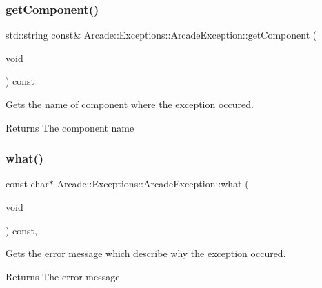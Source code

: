\subsubsection{\texorpdfstring{getComponent()}{getComponent()}}
{\footnotesize\ttfamily std\+::string const\& Arcade\+::\+Exceptions\+::\+Arcade\+Exception\+::get\+Component (\begin{DoxyParamCaption}\item[{void}]{ }\end{DoxyParamCaption}) const\hspace{0.3cm}{\ttfamily [noexcept]}}



Gets the name of component where the exception occured. 

\begin{DoxyReturn}{Returns}
The component name 
\end{DoxyReturn}
\mbox{\label{classArcade_1_1Exceptions_1_1ArcadeException_ab80ccd97194d7c5484ad4d32135eecd1}} 
\subsubsection{\texorpdfstring{what()}{what()}}
{\footnotesize\ttfamily const char$\ast$ Arcade\+::\+Exceptions\+::\+Arcade\+Exception\+::what (\begin{DoxyParamCaption}\item[{void}]{ }\end{DoxyParamCaption}) const\hspace{0.3cm}{\ttfamily [override]}, {\ttfamily [noexcept]}}



Gets the error message which describe why the exception occured. 

\begin{DoxyReturn}{Returns}
The error message 
\end{DoxyReturn}
